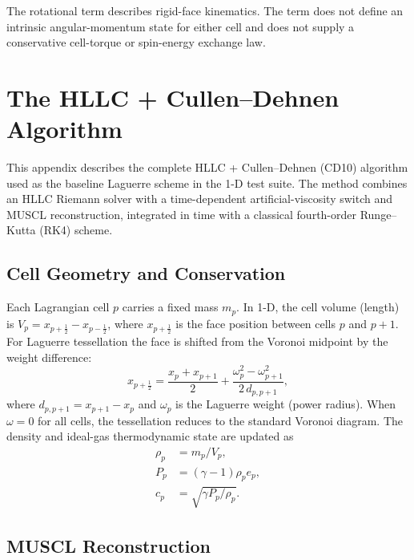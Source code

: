 \documentclass[twocolumn]{aastex63}
\begin{document}
The rotational term describes rigid-face kinematics. The term does not define
an intrinsic angular-momentum state for either cell and does not supply a
conservative cell-torque or spin-energy exchange law.


\section{The HLLC + Cullen--Dehnen Algorithm} \label{app:hllccd}

This appendix describes the complete HLLC + Cullen--Dehnen (CD10) algorithm
used as the baseline Laguerre scheme in the 1-D test suite.
The method combines an HLLC Riemann solver with a
time-dependent artificial-viscosity switch and MUSCL reconstruction,
integrated in time with a classical fourth-order Runge--Kutta (RK4) scheme.

\subsection{Cell Geometry and Conservation}

Each Lagrangian cell $p$ carries a fixed mass $m_p$.
In 1-D, the cell volume (length) is
$V_p = x_{p+\frac{1}{2}} - x_{p-\frac{1}{2}}$,
where $x_{p+\frac{1}{2}}$ is the face position between cells $p$ and $p\!+\!1$.
For Laguerre tessellation the face is shifted from the Voronoi midpoint by
the weight difference:
\begin{equation}
  x_{p+\frac{1}{2}}
  = \frac{x_p + x_{p+1}}{2}
  + \frac{\omega_p^2 - \omega_{p+1}^2}{2\,d_{p,p+1}},
\end{equation}
where $d_{p,p+1} = x_{p+1}-x_p$ and $\omega_p$ is the Laguerre weight
(power radius).
When $\omega=0$ for all cells, the tessellation reduces to the standard
Voronoi diagram.
The density and ideal-gas thermodynamic state are updated as
\begin{equation*}
\begin{aligned}
  \rho_p &= m_p / V_p,\\
  P_p &= (\gamma-1)\rho_p e_p,\\
  c_p &= \sqrt{\gamma P_p / \rho_p}.
\end{aligned}
\end{equation*}


\subsection{MUSCL Reconstruction}
\end{document}
